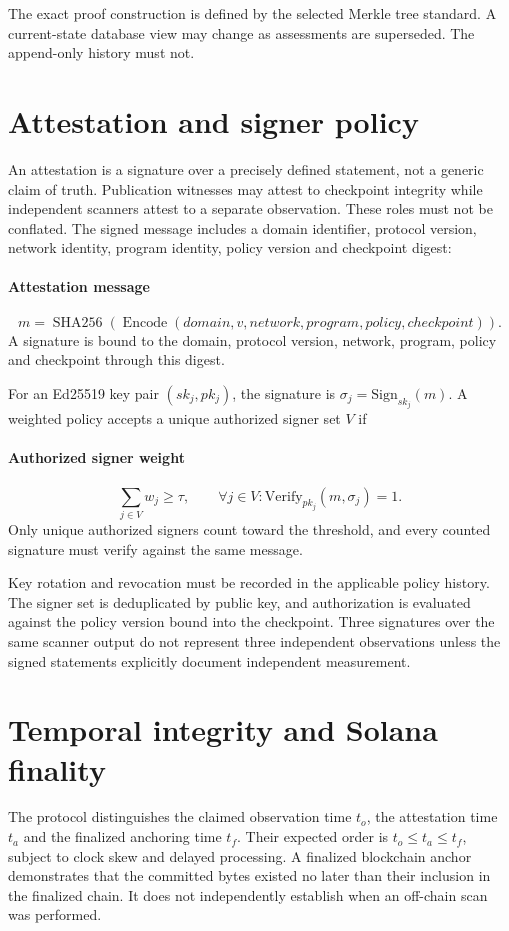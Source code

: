 \documentclass[10pt,a4paper]{article}
\begin{document}
The exact proof construction is defined by the selected Merkle tree standard. A current-state database view may change as assessments are superseded. The append-only history must not.


\section*{Attestation and signer policy}
An attestation is a signature over a precisely defined statement, not a generic claim of truth. Publication witnesses may attest to checkpoint integrity while independent scanners attest to a separate observation. These roles must not be conflated. The signed message includes a domain identifier, protocol version, network identity, program identity, policy version and checkpoint digest:


\paragraph{Attestation message}
\[m=\operatorname{SHA256}(\operatorname{Encode}(domain,v,network,program,policy,checkpoint)).\]
A signature is bound to the domain, protocol version, network, program, policy and checkpoint through this digest.


For an Ed25519 key pair \((sk_j,pk_j)\), the signature is \(\sigma_j=\mathrm{Sign}_{sk_j}(m)\). A weighted policy accepts a unique authorized signer set \(V\) if


\paragraph{Authorized signer weight}
\[\sum_{j\in V}w_j\ge\tau,\qquad\forall j\in V:\mathrm{Verify}_{pk_j}(m,\sigma_j)=1.\]
Only unique authorized signers count toward the threshold, and every counted signature must verify against the same message.


Key rotation and revocation must be recorded in the applicable policy history. The signer set is deduplicated by public key, and authorization is evaluated against the policy version bound into the checkpoint. Three signatures over the same scanner output do not represent three independent observations unless the signed statements explicitly document independent measurement.


\section*{Temporal integrity and Solana finality}
The protocol distinguishes the claimed observation time \(t_o\), the attestation time \(t_a\) and the finalized anchoring time \(t_f\). Their expected order is \(t_o\le t_a\le t_f\), subject to clock skew and delayed processing. A finalized blockchain anchor demonstrates that the committed bytes existed no later than their inclusion in the finalized chain. It does not independently establish when an off-chain scan was performed.
\end{document}
